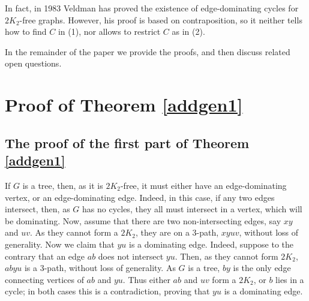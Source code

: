 \documentclass[runningheads,a4paper]{llncs}
\begin{document}
In fact, in 1983 Veldman \cite{veldman83} has proved the existence of
edge-dominating cycles for $2K_2$-free graphs. However, his proof is based on
contraposition, so it neither tells how to find $C$ in (1), nor
allows to restrict $C$ as in (2).

In the remainder of the paper we provide the proofs, and then discuss related
open questions.


\section{Proof of Theorem \ref{addgen1}}

\subsection{The proof of the first part of Theorem \ref{addgen1}}
If $G$ is a tree, then, as it is $2K_2$-free, it must either have an edge-dominating
vertex, or an edge-dominating edge.
Indeed, in this case, if any two edges intersect, then, as $G$ has no cycles,
they all must intersect in a vertex, which will be dominating. Now, assume that there are
two non-intersecting edges, say $xy$ and $uv$. As they cannot form a $2K_2$, they are on
a 3-path, $xyuv$, without loss of generality. Now we claim that $yu$ is a dominating edge.
Indeed, suppose to the contrary that an edge $ab$ does not intersect $yu$. Then, as they
cannot form $2K_2$, $abyu$ is a 3-path, without loss of generality. As $G$ is a tree, $by$
is the only edge connecting vertices of $ab$ and $yu$. Thus either
$ab$ and $uv$ form a $2K_2$, or $b$ lies in a cycle; in both cases this is a contradiction,
proving that $yu$ is a dominating edge.
\end{document}
